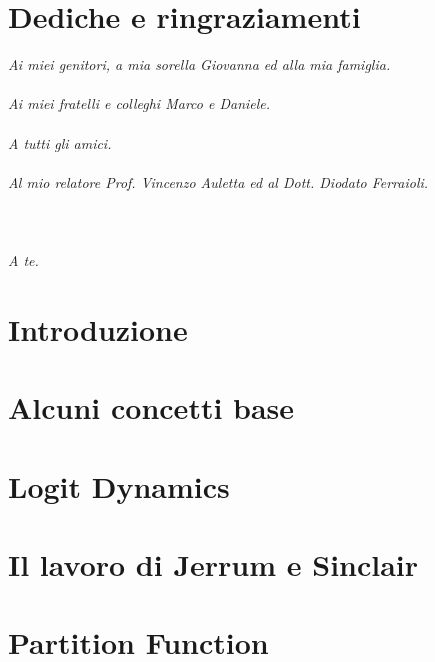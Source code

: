 \documentclass[11pt,oneside]{book}
\theoremstyle{plain}
\begin{document}
\chapter*{Dediche e ringraziamenti}
\vfill
\emph{Ai miei genitori, a mia sorella Giovanna ed alla mia famiglia.}\\\\
\emph{Ai miei fratelli e colleghi Marco e Daniele.}\\\\
\emph{A tutti gli amici.}\\\\
\emph{Al mio relatore Prof. Vincenzo Auletta ed al Dott. Diodato Ferraioli.}\\\\\\\\
\emph{A te.}
\vfill

{\hypersetup{linkcolor=black}
	\tableofcontents
}

\chapter{Introduzione}
\setcounter{page}{1} 		%



\chapter{Alcuni concetti base}\label{chap1}


\chapter{Logit Dynamics}\label{chap3}


\chapter{Il lavoro di Jerrum e Sinclair}\label{chap4}


\chapter{Partition Function}\label{chap5}

\end{document}
